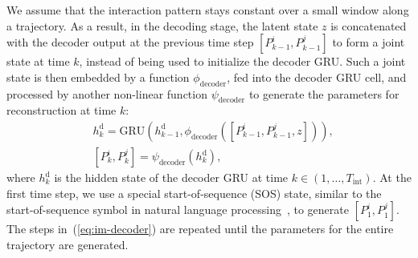 We assume that the interaction pattern stays constant over a small window along a trajectory. As a result, in the decoding stage, the latent state $z$ is concatenated with the decoder output at the previous time step $[P_{k-1}^i, P_{k-1}^j]$ to form a joint state at time $k$, instead of being used to initialize the decoder GRU. Such a joint state is then embedded by a function $\phi_\text{decoder}$, fed into the decoder GRU cell, and processed by another non-linear function $\psi_\text{decoder}$ to generate the parameters for reconstruction at time $k$:
\begin{equation}
\label{eq:im-decoder}
\begin{aligned}
&h_k^\text{d} = \text{GRU} \left( h_{k-1}^\text{d}, \phi_\text{decoder} ([P_{k-1}^i, P_{k-1}^j, z]) \right), \\
&[P_k^i, P_k^j] = \psi_\text{decoder} (h_k^\text{d}),
\end{aligned}
\end{equation}
where $h_k^\text{d}$ is the hidden state of the decoder GRU at time $k \in (1, \dots, T_\text{int})$. At the first time step, we use a special start-of-sequence (SOS) state, similar to the start-of-sequence symbol in natural language processing~\citep{grefenstette2015learning}, to generate $[P_1^i, P_1^j]$. The steps in~(\ref{eq:im-decoder}) are repeated until the parameters for the entire trajectory are generated.

